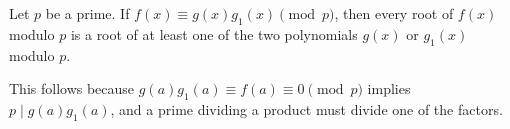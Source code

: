 Let $p$ be a prime. If $f(x) \equiv g(x) g_1(x) \pmod{p}$, then every root of $f(x)$ modulo $p$ is a root of at least one of the two polynomials $g(x)$ or $g_1(x)$ modulo $p$.

This follows because $g(a) g_1(a) \equiv f(a) \equiv 0 \pmod{p}$ implies $p \mid g(a) g_1(a)$, and a prime dividing a product must divide one of the factors.
